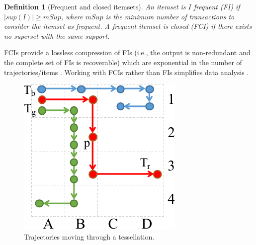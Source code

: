 \documentclass[
]{ceurart}
\newtheorem{definition}{Definition}
\begin{document}
\begin{definition}[Frequent and closed itemsets]\label{def:fci}
An itemset is $I$ \textit{frequent} (FI) if $|sup(I)|\geq mSup$, where $mSup$ is the minimum number of transactions to consider the itemset as frequent.
A frequent itemset is \textit{closed} (FCI) if there exists no superset with the same support. 
\end{definition}

FCIs provide a lossless compression of FIs \citep{DBLP:conf/dmkd/PeiHM00} (i.e., the output is non-redundant and the complete set of FIs is recoverable) which are exponential in the number of trajectories/items \citep{DBLP:conf/vldb/AgrawalS94}. 
Working with FCIs rather than FIs simplifies data analysis \citep{DBLP:journals/isci/FranciaGR20}.


%
\begin{figure}[t]
    \centering
    \includegraphics[scale=.6]{patterns2.pdf}
    \caption{Trajectories moving through a tessellation.}
    \label{fig:patterns2}
\end{figure}
\end{document}
